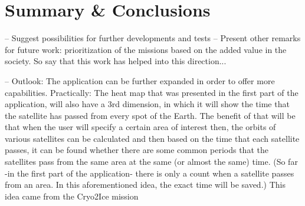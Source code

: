 \chapter{Summary \& Conclusions}
\label{chap:5}

--  Suggest possibilities for further developments and tests
--  Present other remarks for future work: prioritization of the missions based on the added value in the society. So say that this work has helped into this direction...

-- Outlook:
The application can be further expanded in order to offer more capabilities. Practically: The heat map that was presented in the first part of the application, will also have a 3rd dimension, in which it will show the time that the satellite has passed from every spot of the Earth. The benefit of that will be that when the user will specify a certain area of interest then, the orbits of various satellites can be calculated and then based on the time that each satellite passes, it can be found whether there are some common periods that the satellites pass from the same area at the same (or almost the same) time. 
(So far -in the first part of the application- there is only a count when a satellite passes from an area. In this aforementioned idea, the exact time will be saved.)
This idea came from the Cryo2Ice mission %